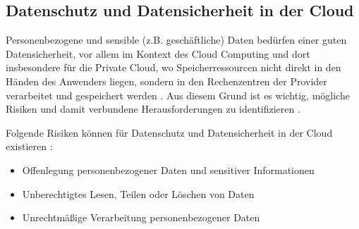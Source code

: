 \subsection{Datenschutz und Datensicherheit in der Cloud}
Personenbezogene und sensible (z.B. geschäftliche) Daten bedürfen einer guten Datensicherheit, vor allem im Kontext des Cloud Computing und dort insbesondere für die Private Cloud, wo Speicherressourcen nicht direkt in den Händen des Anwenders liegen, sondern in den Rechenzentren der Provider verarbeitet und gespeichert werden \cite[Vgl.][S. 1ff]{Sun2019}. Aus diesem Grund ist es wichtig, mögliche Risiken und damit verbundene Herausforderungen zu identifizieren \cite[Vgl.][S. 3]{Sun2019}.

Folgende Risiken können für Datenschutz und Datensicherheit in der Cloud existieren \cite[Vgl. auch im folgenden][S. 3]{Sun2019}:

\begin{itemize}
    \item Offenlegung personenbezogener Daten und sensitiver Informationen
    \item Unberechtigtes Lesen, Teilen oder Löschen von Daten
    \item Unrechtmäßige Verarbeitung personenbezogener Daten
\end{itemize}

\pagebreak